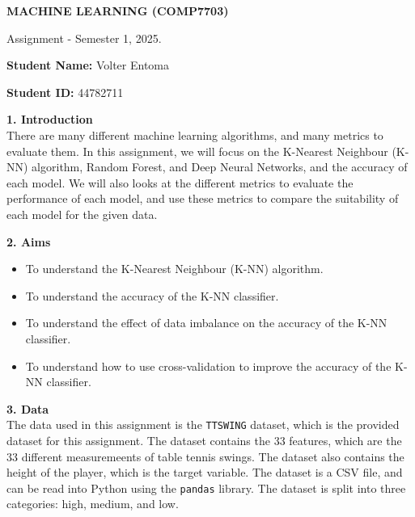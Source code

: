 \documentclass[12pt]{article}
\begin{document}
\begin{center}

{\Large  {\bf MACHINE LEARNING (COMP7703)}

Assignment - Semester 1, 2025.

\vspace{20pt}

{\large \textbf{Student Name:} Volter Entoma}
\vspace{10pt}

{\large \textbf{Student ID:} 44782711}

}
\end{center}

\vspace{20pt}

\textbf{1. Introduction}
\\
There are many different machine learning algorithms, and many metrics to evaluate them. In this assignment, we will focus on the K-Nearest Neighbour (K-NN) algorithm, Random Forest, and Deep Neural Networks, and the accuracy of each model. We will also looks at the different metrics to evaluate the performance of each model, and use these metrics to compare the suitability of each model for the given data.

\vspace{20pt}

\textbf{2. Aims}
\begin{itemize}
	\item To understand the K-Nearest Neighbour (K-NN) algorithm.
	\item To understand the accuracy of the K-NN classifier.
	\item To understand the effect of data imbalance on the accuracy of the K-NN classifier.
	\item To understand how to use cross-validation to improve the accuracy of the K-NN classifier.
\end{itemize}

\vspace{20pt}

\textbf{3. Data}
\\
The data used in this assignment is the \texttt{TTSWING} dataset, which is the provided dataset for this assignment. The dataset contains the 33 features, which are the 33 different measuremeents of table tennis swings. The dataset also contains the height of the player, which is the target variable. The dataset is a CSV file, and can be read into Python using the \texttt{pandas} library. The dataset is split into three categories: high, medium, and low.
\end{document}
